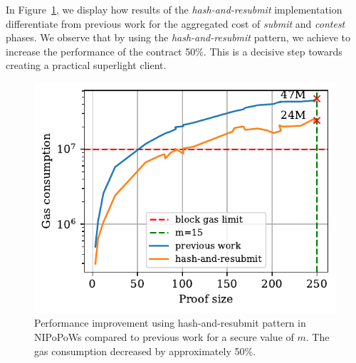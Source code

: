 In Figure~\ref{fig:har-nipopow}, we display how results of the
\emph{hash-and-resubmit} implementation differentiate from previous work for
the aggregated cost of \emph{submit} and \emph{contest} phases.  We observe
that by using the \emph{hash-and-resubmit} pattern, we achieve to increase the
performance of the contract 50\%. This is a decisive step towards creating a
practical superlight client.



\begin{figure}[!h]
    \begin{center}
        \includegraphics[width=1\columnwidth]{figures/har-nipopows.pdf}
    \end{center}
    \caption{Performance improvement using hash-and-resubmit pattern in
    NIPoPoWs compared to previous work for a secure value of $m$. The gas
    consumption decreased by approximately 50\%.}
    \label{fig:har-nipopow}
\end{figure}
